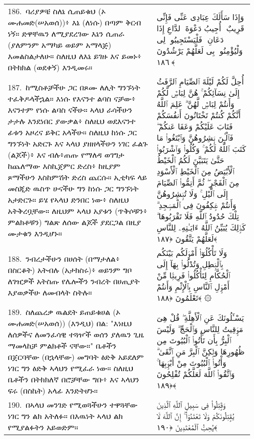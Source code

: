 \documentclass[11pt,a4paper,oneside]{article}%
\newcommand{\mytextarabic}[1]{\textarabic{ #1 \flushright}}
\begin{document}
\begin{longtable}{%
  @{}
    p{}
  @{~~~}
    p{}
    @{}
}
186.\ ባሪያዎቼ ስለኔ ሲጠይቁህ (ኦ ሙሐመድ(ሠአወሰ))፥ እኔ (ለነሱ) በጣም ቅርብ ነኝ። ድዋቸዉን ለሚያደረገው እኔን ሲጠራ (ያለምንም አማካይ ወይም አማላጅ) እመልስልታለሁ። ስለዚህ ለእኔ ይገዙ እና ይመኑ፥ በትክክል (ወደቀኝ) እንዲመሩ። &  \mytextarabic{وَإِذَا سَأَلَكَ عِبَادِى عَنِّى فَإِنِّى قَرِيبٌ ۖ أُجِيبُ دَعْوَةَ ٱلدَّاعِ إِذَا دَعَانِ ۖ فَلْيَسْتَجِيبُوا۟ لِى وَلْيُؤْمِنُوا۟ بِى لَعَلَّهُمْ يَرْشُدُونَ ﴿١٨٦﴾}\\
187.\ ከሚስቶቻችሁ ጋር በጾሙ ለሊት ግንኙነት ተፈቅዶላችኋል። እነሱ የእናንተ ልባስ ናቻው፥ እናንተም የነሱ ልባስ ናችሁ። ኣላህ ራሳችሁን ታታሉ እንደነበር ያውቃል፥ ስለዚህ ወደእናንተ ፊቱን አዞረና ይቅር አላችሁ። ስለዚህ ከነሱ ጋር ግንኙነት አድርጉ እና ኣላህ ያዘዘላችሁን ነገር ፈልጉ (ልጆች)፥ እና ብሉ፥ጠጡ የማለዳ ወገግታ ከጨለማው እስኪጀምር ድረስ፥ ከዚያም ጾማችሁን እስከምሽት ድረስ ጨርሱ። ኢቲካፍ ላይ መስጂድ ዉስጥ ሁናችሁ ግን ከነሱ ጋር ግንኙነት አታድርጉ። ይሄ የኣላህ ድንበር ነው፥ ስለዚህ አትቅረቧቸው። ለዚህም ኣላህ አያቱን (ጥቅሶቹን፥ ምልክቶቹን) ግልጽ ለሰው ልጆች ያደርጋል በዚያ ሙታቁን እንዲሆኑ። &  \mytextarabic{أُحِلَّ لَكُمْ لَيْلَةَ ٱلصِّيَامِ ٱلرَّفَثُ إِلَىٰ نِسَآئِكُمْ ۚ هُنَّ لِبَاسٌۭ لَّكُمْ وَأَنتُمْ لِبَاسٌۭ لَّهُنَّ ۗ عَلِمَ ٱللَّهُ أَنَّكُمْ كُنتُمْ تَخْتَانُونَ أَنفُسَكُمْ فَتَابَ عَلَيْكُمْ وَعَفَا عَنكُمْ ۖ فَٱلْـَٟٔنَ بَٟشِرُوهُنَّ وَٱبْتَغُوا۟ مَا كَتَبَ ٱللَّهُ لَكُمْ ۚ وَكُلُوا۟ وَٱشْرَبُوا۟ حَتَّىٰ يَتَبَيَّنَ لَكُمُ ٱلْخَيْطُ ٱلْأَبْيَضُ مِنَ ٱلْخَيْطِ ٱلْأَسْوَدِ مِنَ ٱلْفَجْرِ ۖ ثُمَّ أَتِمُّوا۟ ٱلصِّيَامَ إِلَى ٱلَّيْلِ ۚ وَلَا تُبَٟشِرُوهُنَّ وَأَنتُمْ عَٟكِفُونَ فِى ٱلْمَسَٟجِدِ ۗ تِلْكَ حُدُودُ ٱللَّهِ فَلَا تَقْرَبُوهَا ۗ كَذَٟلِكَ يُبَيِّنُ ٱللَّهُ ءَايَـٰتِهِۦ لِلنَّاسِ لَعَلَّهُمْ يَتَّقُونَ ﴿١٨٧﴾}\\
188.\ ንብረታችሁን በሀሰት (በማታለል፥ በስርቆት) አትብሉ (አታክስሩ)፥ ወይንም ግቦ ለገዢዎች አትስጡ የሌሎችን ንብረት በሀጢያት እያወቃችሁ ለመብላት ስትሉ። &  \mytextarabic{وَلَا تَأْكُلُوٓا۟ أَمْوَٟلَكُم بَيْنَكُم بِٱلْبَٟطِلِ وَتُدْلُوا۟ بِهَآ إِلَى ٱلْحُكَّامِ لِتَأْكُلُوا۟ فَرِيقًۭا مِّنْ أَمْوَٟلِ ٱلنَّاسِ بِٱلْإِثْمِ وَأَنتُمْ تَعْلَمُونَ ﴿١٨٨﴾ ۞}\\
189.\ ስለጨረቃ ዉልደት ይጠይቁሀል (ኦ ሙሐመድ(ሠአወሰ)) (እንዲህ) በል: "እነዚህ ለሰዎችና ለመንፈሳዊ ተጓዦች ወሰን ያለዉን ጊዜ ማመላከቻ ምልክቶች ናቸው።" ቤቶችን በጀርባቸው (በኋላቸው) መግባት ፅድቅ አይደለም ነገር ግን ፅድቅ ኣላህን የሚፈራ ነው። ስለዚህ ቤቶችን በትክክለኛ በሮቻቸው ግቡ፥ እና ኣላህን ፍሩ (በስኬት) አላፊ እንድትሆኑ። &  \mytextarabic{ يَسْـَٔلُونَكَ عَنِ ٱلْأَهِلَّةِ ۖ قُلْ هِىَ مَوَٟقِيتُ لِلنَّاسِ وَٱلْحَجِّ ۗ وَلَيْسَ ٱلْبِرُّ بِأَن تَأْتُوا۟ ٱلْبُيُوتَ مِن ظُهُورِهَا وَلَٟكِنَّ ٱلْبِرَّ مَنِ ٱتَّقَىٰ ۗ وَأْتُوا۟ ٱلْبُيُوتَ مِنْ أَبْوَٟبِهَا ۚ وَٱتَّقُوا۟ ٱللَّهَ لَعَلَّكُمْ تُفْلِحُونَ ﴿١٨٩﴾}\\
190.\ በኣላህ መንገድ የሚወጓችሁን ተዋጓቸው ነገር ግን ልክ አትለፉ። በእዉነት ኣላህ ልክ የሚያልፉትን አይወድም።  &  \mytextarabic{وَقَٟتِلُوا۟ فِى سَبِيلِ ٱللَّهِ ٱلَّذِينَ يُقَٟتِلُونَكُمْ وَلَا تَعْتَدُوٓا۟ ۚ إِنَّ ٱللَّهَ لَا يُحِبُّ ٱلْمُعْتَدِينَ ﴿١٩٠﴾}\\

\end{longtable}
\end{document}

